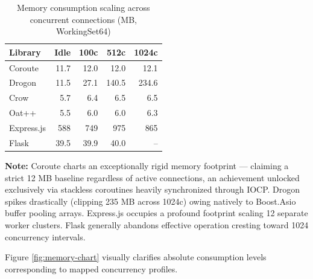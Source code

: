 \begin{table}[H]
\centering
\caption{Memory consumption scaling across concurrent connections (MB, WorkingSet64)}
\label{tab:memory}
\begin{tabular}{|l|r|r|r|r|}
\hline
\textbf{Library} & \textbf{Idle} & \textbf{100c} & \textbf{512c} & \textbf{1024c} \\
\hline
Coroute & 11.7 & 12.0 & 12.0 & 12.1 \\
Drogon & 11.5 & 27.1 & 140.5 & 234.6 \\
Crow & 5.7 & 6.4 & 6.5 & 6.5 \\
Oat++ & 5.5 & 6.0 & 6.0 & 6.3 \\
Express.js & 588 & 749 & 975 & 865 \\
Flask & 39.5 & 39.9 & 40.0 & -- \\
\hline
\end{tabular}
\end{table}

\textbf{Note:} Coroute charts an exceptionally rigid memory footprint --- claiming a strict 12 MB baseline regardless of active connections, an achievement unlocked exclusively via stackless coroutines heavily synchronized through IOCP. Drogon spikes drastically (clipping 235 MB across 1024c) owing natively to Boost.Asio buffer pooling arrays. Express.js occupies a profound footprint scaling 12 separate worker clusters. Flask generally abandons effective operation cresting toward 1024 concurrency intervals.

Figure \ref{fig:memory-chart} visually clarifies absolute consumption levels corresponding to mapped concurrency profiles.

